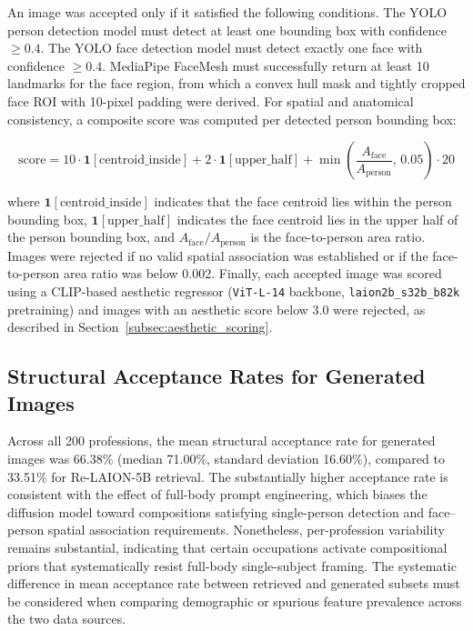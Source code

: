 An image was accepted only if it satisfied the following conditions. The YOLO person detection model must detect at least one bounding box with confidence $\geq 0.4$. The YOLO face detection model must detect exactly one face with confidence $\geq 0.4$. MediaPipe FaceMesh must successfully return at least 10 landmarks for the face region, from which a convex hull mask and tightly cropped face ROI with 10-pixel padding were derived. For spatial and anatomical consistency, a composite score was computed per detected person bounding box:

\[
	\text{score} = 10 \cdot \mathbf{1}[\text{centroid\_inside}] + 2 \cdot
	\mathbf{1}[\text{upper\_half}] + \min\!\left(\frac{A_\text{face}}{A_\text{person}},\,
	0.05\right) \cdot 20
\]

where $\mathbf{1}[\text{centroid\_inside}]$ indicates that the face centroid lies within the person bounding box, $\mathbf{1}[\text{upper\_half}]$ indicates the face centroid lies in the upper half of the person bounding box, and $A_\text{face}/A_\text{person}$ is the face-to-person area ratio. Images were rejected if no valid spatial association was established or if the face-to-person area ratio was below 0.002. Finally, each accepted image was scored using a CLIP-based aesthetic regressor (\texttt{ViT-L-14} backbone, \texttt{laion2b\_s32b\_b82k} pretraining) and images with an aesthetic score below 3.0 were rejected, as described in Section~\ref{subsec:aesthetic_scoring}.

\subsection{Structural Acceptance Rates for Generated Images}
\label{subsec:gen_acceptance}

Across all 200 professions, the mean structural acceptance rate for generated images was 66.38\% (median 71.00\%, standard deviation 16.60\%), compared to 33.51\% for Re-LAION-5B retrieval. The substantially higher acceptance rate is consistent with the effect of full-body prompt engineering, which biases the diffusion model toward compositions satisfying single-person detection and face--person spatial association requirements. Nonetheless, per-profession variability remains substantial, indicating that certain occupations activate compositional priors that systematically resist full-body single-subject framing. The systematic difference in mean acceptance rate between retrieved and generated subsets must be considered when comparing demographic or spurious feature prevalence across the two data sources.

